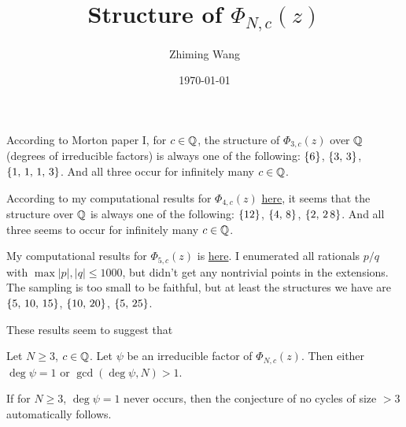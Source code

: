 

\title{Structure of $\Phi_{N,c}(z)$}
\author{Zhiming Wang}
\date{\today}



\maketitle

According to Morton paper I, for $c \in \mathbb{Q}$, the structure of
$\Phi_{3,c}(z)$ over $\mathbb{Q}$ (degrees of irreducible factors) is always
one of the following: $\left\{6\right\}$, $\left\{3,\, 3\right\}$, $\left\{1,\, 1,\, 1,\,
  3\right\}$. And all three occur for infinitely many $c \in \mathbb{Q}$.

According to my computational results for $\Phi_{4, c}(z)$
\href{http://goo.gl/wgS3dn}{here}, it seems that the structure over
$\mathbb{Q}$ is always one of the following: $\left\{12\right\}$, $\left\{4,\, 8\right\}$,
$\left\{2,\, 2\, 8\right\}$. And all three seems to occur for infinitely many
$c \in \mathbb{Q}$.

My computational results for $\Phi_{5, c}(z)$ is
\href{http://goo.gl/dqjs8q}{here}. I enumerated all rationals $p/q$
with $\max{|p|, |q|} \le 1000$, but didn't get any nontrivial points
in the extensions. The sampling is too small to be faithful, but at
least the structures we have are $\left\{5,\, 10,\, 15\right\}$, $\left\{10,\,
  20\right\}$, $\left\{5,\, 25\right\}$.

These results seem to suggest that

\begin{conjecture}
  Let $N \ge 3$, $c \in \mathbb{Q}$. Let $\psi$ be an irreducible factor of
  $\Phi_{N, c}(z)$. Then either $\deg \psi = 1$ or $\gcd(\deg \psi, N)
  > 1$.
\end{conjecture}

\begin{remark}
  If for $N \ge 3$, $\deg \psi = 1$ never occurs, then the conjecture
  of no cycles of size $>3$ automatically follows.
\end{remark}


